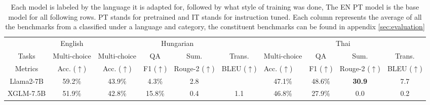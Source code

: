 {\begin{table}[]
\centering
\caption{Each model is labeled by the language it is adapted for, followed by what style of training was done, The EN PT model is the base model for all following rows. PT stands for pretrained and IT stands for instruction tuned. Each column represents the average of all the benchmarks from a classified under a language and category, the constituent benchmarks can be found in appendix \ref{sec:evaluation}}
\label{tab:main_restult}
\begin{adjustbox}{max width=\textwidth}
\setlength{\tabcolsep}{2pt}
\begin{tabular}{ccccllllll}
\toprule
\multicolumn{1}{l}{} & English                   & \multicolumn{4}{c}{Hungarian}                                                                                            & \multicolumn{4}{c}{Thai}                                                                                                                     \\
\cmidrule(lr){2-2} \cmidrule(lr){3-6} \cmidrule(lr){7-10}
Tasks                & Multi-choice         & Multi-choice         & QA        & \multicolumn{1}{c}{Sum.} & \multicolumn{1}{c}{Trans.} & \multicolumn{1}{c}{Multi-choice} & \multicolumn{1}{c}{QA} & \multicolumn{1}{c}{Sum.} & \multicolumn{1}{c}{Trans.} \\
Metrics                & Acc. ($\uparrow$)         & Acc. ($\uparrow$)         & F1 ($\uparrow$)        & Rouge-2 ($\uparrow$)  & BLEU ($\uparrow$) & Acc. ($\uparrow$) & F1 ($\uparrow$)        & Rouge-2 ($\uparrow$)  & BLEU ($\uparrow$) \\
\midrule
Llama2-7B               &      59.2\%         &     43.9\%         &       4.3\%       &  \multicolumn{1}{c}{2.8}                                   &\multicolumn{1}{c}{}                                 & \multicolumn{1}{c}{47.1\%}                                  & \multicolumn{1}{c}{48.6\%}                                   & \multicolumn{1}{c}{\textbf{30.9}}                                   & \multicolumn{1}{c}{7.7} \\
XGLM-7.5B              &      51.9\%              &    42.8\%          &   \multicolumn{1}{c}{15.8\%}                                   &\multicolumn{1}{c}{0.4}                                 & \multicolumn{1}{c}{1.1}                                  & \multicolumn{1}{c}{46.8\%}                                   & \multicolumn{1}{c}{27.9\%}                                   & \multicolumn{1}{c}{0.0} & \multicolumn{1}{c}{0.2}\\

\end{tabular}
\end{adjustbox}
\end{table}}
